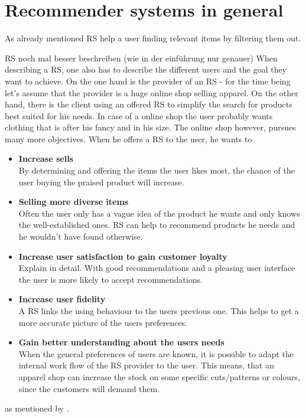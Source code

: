 

\section{Recommender systems in general}
As already mentioned RS help a user finding relevant items by filtering them out.

{\color{red}RS noch mal besser beschreiben (wie in der einf\"uhrung nur genauer)}
When describing a RS, one also has to describe the different users and the goal they want to achieve.
On the one hand is the provider of an RS - for the time being let's assume that the provider is a huge online shop selling apparel.
On the other hand, there is the client using an offered RS to simplify the search for products best suited for his needs.
In case of a online shop the user probably wants clothing that is after his fancy and in his size.
The online shop however, pursues many more objectives.
When he offers a RS to the user, he wants to
\begin{itemize}
    \item\textbf{Increase sells}\hfill\\
        By determining and offering the items the user likes most, the chance of the user buying the praised product will increase.
    \item\textbf{Selling more diverse items}\hfill\\
        Often the user only has a vague idea of the product he wants and only knows the well-established ones.
        RS can help to recommend products he needs and he wouldn't have found otherwise.
    \item\textbf{Increase user satisfaction to gain customer loyalty}\hfill\\
        {\color{red} Explain in detail.}
        With good recommendations and a pleasing user interface the user is more likely to accept recommendations.
    \item\textbf{Increase user fidelity}\hfill\\
        A RS links the using behaviour to the users previous one.
        This helps to get a more accurate picture of the users preferences.
    \item\textbf{Gain better understanding about the users needs}\hfill\\
        When the general preferences of users are known, it is possible to adapt the internal work flow of the RS provider to the user.
        This means, that an apparel shop can increase the stock on some specific cuts/patterns or colours, since the customers will demand them.
\end{itemize}
as mentioned by \citeauthor{ricci:2011}.\citep[p.~4-5]{ricci:2011}
\\

